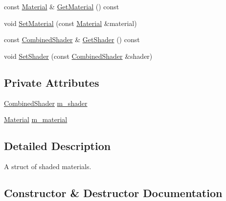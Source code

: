 \begin{DoxyCompactItemize}
\item 
const \hyperlink{structmage_1_1_material}{Material} \& \hyperlink{structmage_1_1_shaded_material_a936a1cb2c79b28818814ac504d059ea3}{Get\+Material} () const
\item 
void \hyperlink{structmage_1_1_shaded_material_aca5966123c3267d431539bea500d244b}{Set\+Material} (const \hyperlink{structmage_1_1_material}{Material} \&material)
\item 
const \hyperlink{structmage_1_1_combined_shader}{Combined\+Shader} \& \hyperlink{structmage_1_1_shaded_material_ac03da6f1dfd81fc19da5a8f8214662ee}{Get\+Shader} () const
\item 
void \hyperlink{structmage_1_1_shaded_material_a65646872fce0961e7ac346be162e89ec}{Set\+Shader} (const \hyperlink{structmage_1_1_combined_shader}{Combined\+Shader} \&shader)
\end{DoxyCompactItemize}
\subsection*{Private Attributes}
\begin{DoxyCompactItemize}
\item 
\hyperlink{structmage_1_1_combined_shader}{Combined\+Shader} \hyperlink{structmage_1_1_shaded_material_a712d07ac1995ff592bbb8ab20a294270}{m\+\_\+shader}
\item 
\hyperlink{structmage_1_1_material}{Material} \hyperlink{structmage_1_1_shaded_material_a319e1ca2103c50f84ce0605b08bd34b4}{m\+\_\+material}
\end{DoxyCompactItemize}


\subsection{Detailed Description}
A struct of shaded materials. 

\subsection{Constructor \& Destructor Documentation}
\hypertarget{structmage_1_1_shaded_material_a58594c0008865c68efc6ff6868016236}{}\label{structmage_1_1_shaded_material_a58594c0008865c68efc6ff6868016236} 
